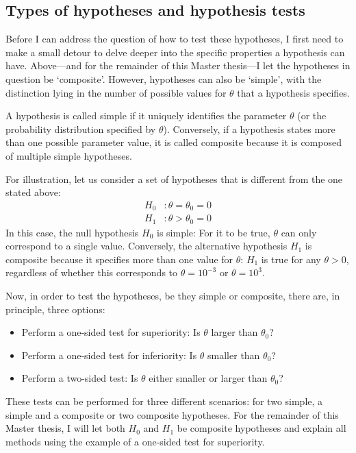 \subsection{Types of hypotheses and hypothesis tests}
\label{subsec:hypothesis_types}
Before I can address the question of how to test these hypotheses, I first need to make a small detour to delve deeper into the specific properties a hypothesis can have. Above---and for the remainder of this Master thesis---I let the hypotheses in question be `composite'. However, hypotheses can also be `simple', with the distinction lying in the number of possible values for $\theta$ that a hypothesis specifies.\par
A hypothesis is called simple if it uniquely identifies the parameter $\theta$ (or the probability distribution specified by $\theta$). Conversely, if a hypothesis states more than one possible parameter value, it is called composite because it is composed of multiple simple hypotheses.\par
For illustration, let us consider a set of hypotheses that is different from the one stated above:
\begin{align*}
    H_0 &: \theta = \theta_0 = 0 \\
    H_1 &: \theta > \theta_0 = 0
\end{align*}
In this case, the null hypothesis $H_0$ is simple: For it to be true, $\theta$ can only correspond to a single value. Conversely, the alternative hypothesis $H_1$ is composite because it specifies more than one value for $\theta$: $H_1$ is true for any ${\theta > 0}$, regardless of whether this corresponds to ${\theta = 10^{-3}}$ or ${\theta = 10^3}$.\par
Now, in order to test the hypotheses, be they simple or composite, there are, in principle, three options:
\begin{itemize}
    \item Perform a one-sided test for superiority: Is $\theta$ larger than $\theta_0$?
    \item Perform a one-sided test for inferiority: Is $\theta$ smaller than $\theta_0$?
    \item Perform a two-sided test: Is $\theta$ either smaller or larger than $\theta_0$?
\end{itemize}
These tests can be performed for three different scenarios: for two simple, a simple and a composite or two composite hypotheses. For the remainder of this Master thesis, I will let both $H_0$ and $H_1$ be composite hypotheses and explain all methods using the example of a one-sided test for superiority.\par

